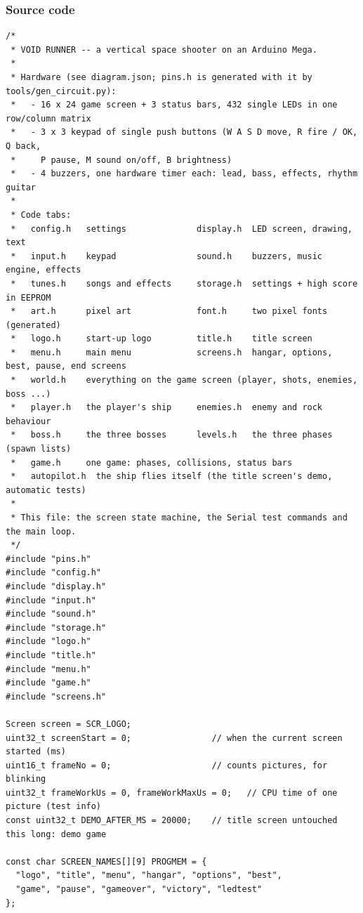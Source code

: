\documentclass[11pt,a4paper]{article}
\begin{document}
\subsubsection*{Source code}
\begin{lstlisting}[language=Arduino]
/*
 * VOID RUNNER -- a vertical space shooter on an Arduino Mega.
 *
 * Hardware (see diagram.json; pins.h is generated with it by tools/gen_circuit.py):
 *   - 16 x 24 game screen + 3 status bars, 432 single LEDs in one row/column matrix
 *   - 3 x 3 keypad of single push buttons (W A S D move, R fire / OK, Q back,
 *     P pause, M sound on/off, B brightness)
 *   - 4 buzzers, one hardware timer each: lead, bass, effects, rhythm guitar
 *
 * Code tabs:
 *   config.h   settings              display.h  LED screen, drawing, text
 *   input.h    keypad                sound.h    buzzers, music engine, effects
 *   tunes.h    songs and effects     storage.h  settings + high score in EEPROM
 *   art.h      pixel art             font.h     two pixel fonts (generated)
 *   logo.h     start-up logo         title.h    title screen
 *   menu.h     main menu             screens.h  hangar, options, best, pause, end screens
 *   world.h    everything on the game screen (player, shots, enemies, boss ...)
 *   player.h   the player's ship     enemies.h  enemy and rock behaviour
 *   boss.h     the three bosses      levels.h   the three phases (spawn lists)
 *   game.h     one game: phases, collisions, status bars
 *   autopilot.h  the ship flies itself (the title screen's demo, automatic tests)
 *
 * This file: the screen state machine, the Serial test commands and the main loop.
 */
#include "pins.h"
#include "config.h"
#include "display.h"
#include "input.h"
#include "sound.h"
#include "storage.h"
#include "logo.h"
#include "title.h"
#include "menu.h"
#include "game.h"
#include "screens.h"

Screen screen = SCR_LOGO;
uint32_t screenStart = 0;                // when the current screen started (ms)
uint16_t frameNo = 0;                    // counts pictures, for blinking
uint32_t frameWorkUs = 0, frameWorkMaxUs = 0;   // CPU time of one picture (test info)
const uint32_t DEMO_AFTER_MS = 20000;    // title screen untouched this long: demo game

const char SCREEN_NAMES[][9] PROGMEM = {
  "logo", "title", "menu", "hangar", "options", "best",
  "game", "pause", "gameover", "victory", "ledtest"
};


\end{lstlisting}
\end{document}
